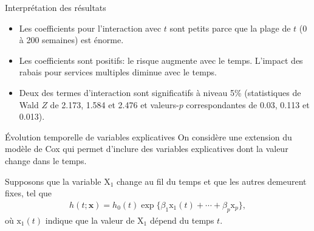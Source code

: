\documentclass[
  ignorenonframetext,
]{beamer}
\providecommand{\tightlist}{%
  \setlength{\itemsep}{0pt}\setlength{\parskip}{0pt}}\usepackage{longtable,booktabs,array}
\begin{document}
\begin{frame}{Interprétation des résultats}
\protect\hypertarget{interpruxe9tation-des-ruxe9sultats}{}
\begin{itemize}
\tightlist
\item
  Les coefficients pour l'interaction avec \(t\) sont petits parce que
  la plage de \(t\) (0 à 200 semaines) est énorme.
\item
  Les coefficients sont positifs: le risque augmente avec le temps.
  L'impact des rabais pour services multiples diminue avec le temps.
\item
  Deux des termes d'interaction sont significatifs à niveau 5\%
  (statistiques de Wald \(Z\) de 2.173, 1.584 et 2.476 et valeurs-\(p\)
  correspondantes de 0.03, 0.113 et 0.013).
\end{itemize}
\end{frame}

\begin{frame}{Évolution temporelle de variables explicatives}
\protect\hypertarget{uxe9volution-temporelle-de-variables-explicatives}{}
On considère une extension du modèle de Cox qui permet d'inclure des
variables explicatives dont la valeur change dans le temps.

Supposons que la variable \(\mathrm{X}_1\) change au fil du temps et que
les autres demeurent fixes, tel que \begin{align*}
h(t; \boldsymbol{x}) = h_0(t) \exp\{\beta_1\mathrm{x}_1(t) + \cdots + \beta_p\mathrm{x}_p\},
\end{align*} où \(\mathrm{x}_1(t)\) indique que la valeur de
\(\mathrm{X}_1\) dépend du temps \(t\).
\end{frame}
\end{document}
